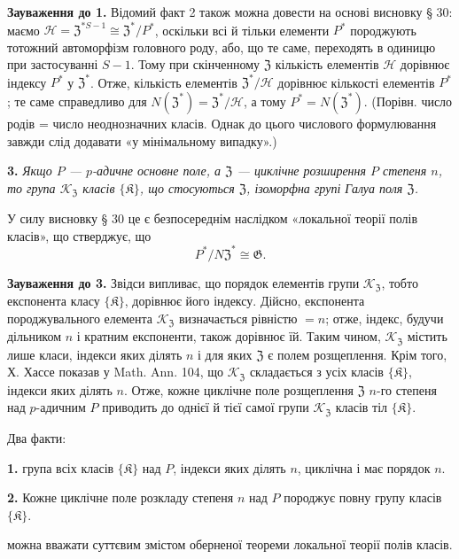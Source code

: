 \documentclass[11pt]{article}
\begin{document}
\noindent\textbf{Зауваження до 1.} Відомий факт 2 також можна довести на основі висновку § 30: маємо \(\mathscr H=\mathfrak Z^{*S-1}\cong\mathfrak Z^*/P^*\), оскільки всі й тільки елементи \(P^*\) породжують тотожний автоморфізм головного роду, або, що те саме, переходять в одиницю при застосуванні \(S-1\). Тому при скінченному \(\mathfrak Z\) кількість елементів \(\mathscr H\) дорівнює індексу \(P^*\) у \(\mathfrak Z^*\). Отже, кількість елементів \(\mathfrak Z^*/\mathscr H\) дорівнює кількості елементів \(P^*\); те саме справедливо для \(N(\mathfrak Z^*)=\mathfrak Z^*/\mathscr H\), а тому \(P^*=N(\mathfrak Z^*)\). (Порівн. число родів = число неоднозначних класів. Однак до цього числового формулювання завжди слід додавати «у мінімальному випадку».)

\noindent\textbf{3.} \emph{Якщо \(P\) --- \(p\)-адичне основне поле, а \(\mathfrak Z\) --- циклічне розширення \(P\) степеня \(n\), то група \(\mathscr K_{\mathfrak Z}\) класів \(\{\mathfrak K\}\), що стосуються \(\mathfrak Z\), ізоморфна групі Галуа поля \(\mathfrak Z\).}

У силу висновку § 30 це є безпосереднім наслідком «локальної теорії полів класів», що стверджує, що
\[
P^*/N\mathfrak Z^*\cong\mathfrak G.
\]

\noindent\textbf{Зауваження до 3.} Звідси випливає, що порядок елементів групи \(\mathscr K_{\mathfrak Z}\), тобто експонента класу \(\{\mathfrak K\}\), дорівнює його індексу. Дійсно, експонента породжувального елемента \(\mathscr K_{\mathfrak Z}\) визначається рівністю \(=n\); отже, індекс, будучи дільником \(n\) і кратним експоненти, також дорівнює їй. Таким чином, \(\mathscr K_{\mathfrak Z}\) містить лише класи, індекси яких ділять \(n\) і для яких \(\mathfrak Z\) є полем розщеплення. Крім того, Х. Хассе показав у Math. Ann. 104, що \(\mathscr K_{\mathfrak Z}\) складається з усіх класів \(\{\mathfrak K\}\), індекси яких ділять \(n\). Отже, кожне циклічне поле розщеплення \(\mathfrak Z\) \(n\)-го степеня над \(p\)-адичним \(P\) приводить до однієї й тієї самої групи \(\mathscr K_{\mathfrak Z}\) класів тіл \(\{\mathfrak K\}\).

Два факти:

\noindent\textbf{1.} група всіх класів \(\{\mathfrak K\}\) над \(P\), індекси яких ділять \(n\), циклічна і має порядок \(n\).

\noindent\textbf{2.} Кожне циклічне поле розкладу степеня \(n\) над \(P\) породжує повну групу класів \(\{\mathfrak K\}\).

можна вважати суттєвим змістом оберненої теореми локальної теорії полів класів.


\clearpage
\end{document}
